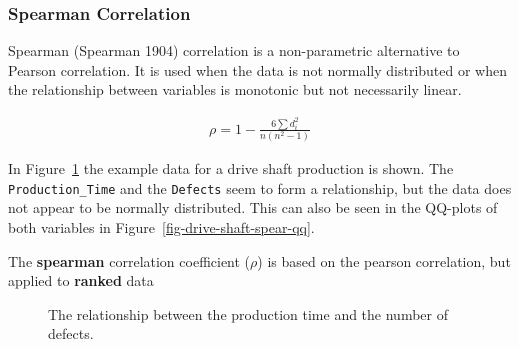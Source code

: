 \documentclass[
  a4paper,
]{scrbook}
\begin{document}
\subsubsection{Spearman Correlation}\label{spearman-correlation}

Spearman (Spearman 1904) correlation is a non-parametric alternative to
Pearson correlation. It is used when the data is not normally
distributed or when the relationship between variables is monotonic but
not necessarily linear.

\begin{align}
\rho = 1 - \frac{6 \sum d_i^2}{n(n^2 - 1)} \label{spearcorr}
\end{align}

In Figure~\ref{fig-drive-shaft-corr-spear} the example data for a drive
shaft production is shown. The \texttt{Production\_Time} and the
\texttt{Defects} seem to form a relationship, but the data does not
appear to be normally distributed. This can also be seen in the QQ-plots
of both variables in Figure~\ref{fig-drive-shaft-spear-qq}.

The \textbf{spearman} correlation coefficient (\(\rho\)) is based on the
pearson correlation, but applied to \textbf{ranked} data

\begin{figure}[ht]


\caption{\label{fig-drive-shaft-corr-spear}The relationship between the
production time and the number of defects.}

\end{figure}%
\end{document}
